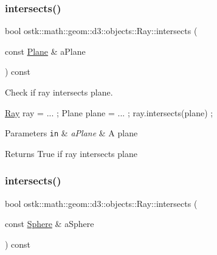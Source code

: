 \subsubsection{\texorpdfstring{intersects()}{intersects()}\hspace{0.1cm}{\footnotesize\ttfamily [2/4]}}
{\footnotesize\ttfamily bool ostk\+::math\+::geom\+::d3\+::objects\+::\+Ray\+::intersects (\begin{DoxyParamCaption}\item[{const \hyperlink{classostk_1_1math_1_1geom_1_1d3_1_1objects_1_1_plane}{Plane} \&}]{a\+Plane }\end{DoxyParamCaption}) const}



Check if ray intersects plane. 


\begin{DoxyCode}
\hyperlink{classostk_1_1math_1_1geom_1_1d3_1_1objects_1_1_ray_a78335698f8a4f72e613e607b13121df0}{Ray} ray = ... ;
Plane plane = ... ;
ray.intersects(plane) ;
\end{DoxyCode}



\begin{DoxyParams}[1]{Parameters}
\mbox{\tt in}  & {\em a\+Plane} & A plane \\
\hline
\end{DoxyParams}
\begin{DoxyReturn}{Returns}
True if ray intersects plane 
\end{DoxyReturn}
\mbox{\label{classostk_1_1math_1_1geom_1_1d3_1_1objects_1_1_ray_a0b01dbc44a2f8afdbef8495ab09d7457}} 
\subsubsection{\texorpdfstring{intersects()}{intersects()}\hspace{0.1cm}{\footnotesize\ttfamily [3/4]}}
{\footnotesize\ttfamily bool ostk\+::math\+::geom\+::d3\+::objects\+::\+Ray\+::intersects (\begin{DoxyParamCaption}\item[{const \hyperlink{classostk_1_1math_1_1geom_1_1d3_1_1objects_1_1_sphere}{Sphere} \&}]{a\+Sphere }\end{DoxyParamCaption}) const}



